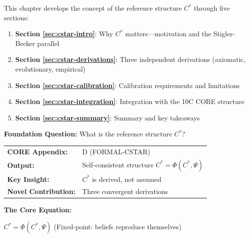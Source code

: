 \begin{tcolorbox}[
    colback=green!5!white,
    colframe=green!75!black,
    title={\textbf{Chapter Overview}},
    fonttitle=\bfseries
]
This chapter develops the concept of the reference structure $C^*$ through five sections:

\begin{enumerate}[nosep]
    \item \textbf{Section \ref{sec:cstar-intro}}: Why $C^*$ matters---motivation and the Stigler-Becker parallel
    \item \textbf{Section \ref{sec:cstar-derivations}}: Three independent derivations (axiomatic, evolutionary, empirical)
    \item \textbf{Section \ref{sec:cstar-calibration}}: Calibration requirements and limitations
    \item \textbf{Section \ref{sec:cstar-integration}}: Integration with the 10C CORE structure
    \item \textbf{Section \ref{sec:cstar-summary}}: Summary and key takeaways
\end{enumerate}
\end{tcolorbox}


\begin{tcolorbox}[
    colback=blue!5!white,
    colframe=blue!75!black,
    title={\textbf{10C CORE Connection: Foundation for HOW}},
    fonttitle=\bfseries
]
\textbf{Foundation Question:} What is the reference structure $C^*$?

\medskip
\begin{tabular}{ll}
\textbf{CORE Appendix:} & D (FORMAL-CSTAR) \\
\textbf{Output:} & Self-consistent structure $C^* = \Phi(C^*, \Psi)$ \\
\textbf{Key Insight:} & $C^*$ is derived, not assumed \\
\textbf{Novel Contribution:} & Three convergent derivations
\end{tabular}

\medskip
\textbf{The Core Equation:}
\begin{center}
$C^* = \Phi(C^*, \Psi)$ \quad (Fixed-point: beliefs reproduce themselves)
\end{center}
\end{tcolorbox}

